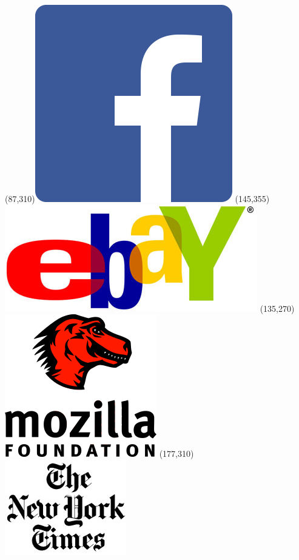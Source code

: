 \begin{frame}
\Put(87,310){\includegraphics[scale=.15]{../common/pics/R_using_logos/fb}}
\Put(145,355){\includegraphics[scale=.12]{../common/pics/R_using_logos/ebay}}
\Put(135,270){\includegraphics[scale=.9]{../common/pics/R_using_logos/mozilla}}
\Put(177,310){\includegraphics[scale=.35]{../common/pics/R_using_logos/nyt}}

\end{frame}
